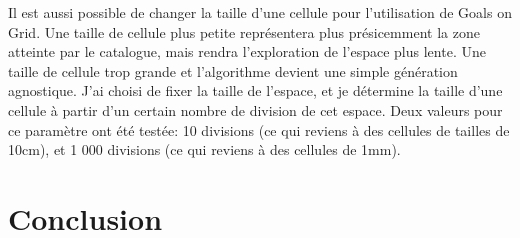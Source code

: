 \documentclass[11pt,french]{report}
\begin{document}
Il est aussi possible de changer la taille d'une cellule pour l'utilisation de Goals on Grid.
Une taille de cellule plus petite représentera plus présicemment la zone atteinte par le catalogue, mais rendra l'exploration de l'espace plus lente.
Une taille de cellule trop grande et l'algorithme devient une simple génération agnostique.
J'ai choisi de fixer la taille de l'espace, et je détermine la taille d'une cellule à partir d'un certain nombre de division de cet espace.
Deux valeurs pour ce paramètre ont été testée: 10 divisions (ce qui reviens à des cellules de tailles de 10cm), et 1 000 divisions (ce qui reviens à des cellules de 1mm).

\chapter{Conclusion}
\end{document}
